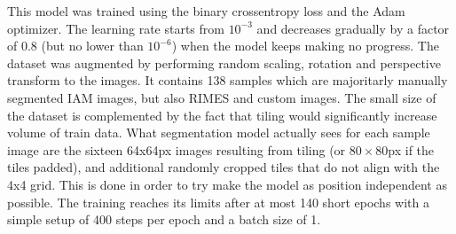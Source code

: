 This model was trained using the binary crossentropy loss and the Adam optimizer. The learning rate starts from $10^{-3}$ and decreases gradually by a factor of $0.8$ (but no lower than $10^{-6}$) when the model keeps making no progress. The dataset was augmented by performing random scaling, rotation and perspective transform to the images. It contains 138 samples which are majoritarly manually segmented IAM images, but also RIMES and custom images. The small size of the dataset is complemented by the fact that tiling would significantly increase volume of train data. What segmentation model actually sees for each sample image are the sixteen 64x64px images resulting from tiling (or $80\times80$px if the tiles padded), and additional randomly cropped tiles that do not align with the 4x4 grid. This is done in order to try make the model as position independent as possible. The training  reaches its limits after at most 140 short epochs with a simple setup of 400 steps per epoch and a batch size of 1. 

